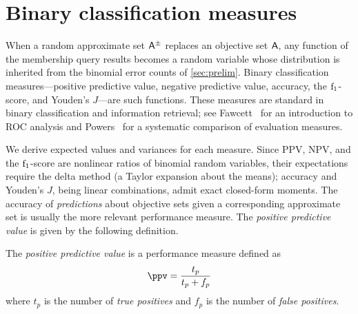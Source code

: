 
\section{Binary classification measures}
\label{sec:measures}

When a random approximate set $\ASet{A}$ replaces an objective set $\Set{A}$, any function of the membership query results becomes a random variable whose distribution is inherited from the binomial error counts of \cref{sec:prelim}.
Binary classification measures---positive predictive value, negative predictive value, accuracy, the $\mathrm{f}_1$-score, and Youden's $J$---are such functions.
These measures are standard in binary classification and information retrieval; see Fawcett~\cite{fawcettROC} for an introduction to ROC analysis and Powers~\cite{powersEval} for a systematic comparison of evaluation measures.

We derive expected values and variances for each measure.
Since PPV, NPV, and the $\mathrm{f}_1$-score are nonlinear ratios of binomial random variables, their expectations require the delta method (a Taylor expansion about the means); accuracy and Youden's $J$, being linear combinations, admit exact closed-form moments.
The accuracy of \emph{predictions} about objective sets given a corresponding approximate set is usually the more relevant performance measure.
The \emph{positive predictive value} is given by the following definition.
\begin{definition}
	The \emph{positive predictive value} is a performance measure defined as
	\begin{equation}
	\ppv = \frac{t_p}{t_p + f_p}
	\end{equation}
	where $t_p$ is the number of \emph{true positives} and $f_p$ is the number of \emph{false positives}.
\end{definition}

